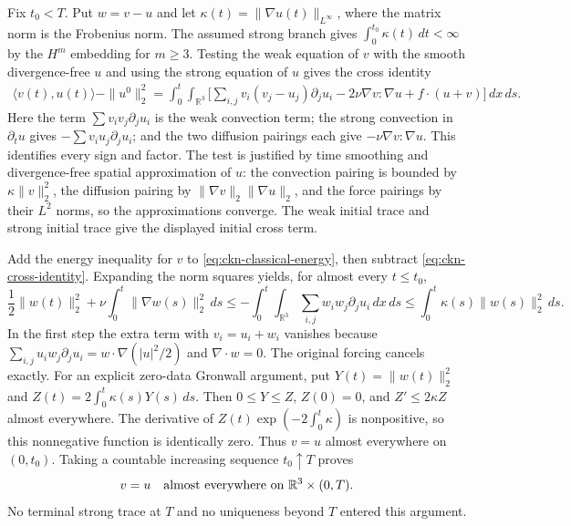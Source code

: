 Fix $t_0<T$. Put $w=v-u$ and let
$\kappa(t)=\|\nabla u(t)\|_{L^\infty}$, where the matrix norm is the
Frobenius norm. The assumed strong branch gives
$\int_0^{t_0}\kappa(t)\,dt<\infty$ by the $H^m$ embedding for $m\geq3$.
Testing the weak equation of $v$ with the smooth divergence-free $u$
and using the strong equation of $u$ gives the cross identity
\begin{align}\label{eq:ckn-cross-identity}
 \langle v(t),u(t)\rangle-\|u^0\|_2^2
 =\int_0^t\int_{\mathbb R^3}
 \bigg[\sum_{i,j}v_i(v_j-u_j)\partial_j u_i
 -2\nu\nabla v:\nabla u+f\cdot(u+v)\bigg]\,dx\,ds.
\end{align}
Here the term $\sum v_iv_j\partial_j u_i$ is the weak convection
term; the strong convection in $\partial_tu$ gives
$-\sum v_i u_j\partial_j u_i$; and the two diffusion pairings each
give $-\nu\nabla v:\nabla u$. This identifies every sign and factor.
The test is justified by time smoothing and divergence-free spatial
approximation of $u$: the convection pairing is bounded by
$\kappa\|v\|_2^2$, the diffusion pairing by
$\|\nabla v\|_2\|\nabla u\|_2$, and the force pairings by their
$L^2$ norms, so the approximations converge. The weak initial trace
and strong initial trace give the displayed initial cross term.

Add the energy inequality for $v$ to
\eqref{eq:ckn-classical-energy}, then subtract
\eqref{eq:ckn-cross-identity}. Expanding the norm squares yields,
for almost every $t\leq t_0$,
\begin{equation}\label{eq:ckn-relative-energy}
 \frac12\|w(t)\|_2^2+\nu\int_0^t\|\nabla w(s)\|_2^2\,ds
 \leq-\int_0^t\int_{\mathbb R^3}
 \sum_{i,j}w_iw_j\partial_j u_i\,dx\,ds
 \leq\int_0^t\kappa(s)\|w(s)\|_2^2\,ds.
\end{equation}
In the first step the extra term with $v_i=u_i+w_i$ vanishes because
$\sum_{i,j}u_iw_j\partial_j u_i=w\cdot\nabla(|u|^2/2)$ and
$\nabla\cdot w=0$. The original forcing cancels exactly.
For an explicit zero-data Gronwall argument, put
$Y(t)=\|w(t)\|_2^2$ and
$Z(t)=2\int_0^t\kappa(s)Y(s)\,ds$.
Then $0\leq Y\leq Z$, $Z(0)=0$, and
$Z'\leq2\kappa Z$ almost everywhere.
The derivative of $Z(t)\exp(-2\int_0^t\kappa)$ is nonpositive,
so this nonnegative function is identically zero. Thus $v=u$ almost
everywhere on $(0,t_0)$. Taking a countable increasing sequence
$t_0\uparrow T$ proves
\begin{equation}\label{eq:ckn-agreement}
 v=u\quad\hbox{almost everywhere on }\mathbb R^3\times(0,T).
\end{equation}
No terminal strong trace at $T$ and no uniqueness beyond $T$ entered
this argument.

